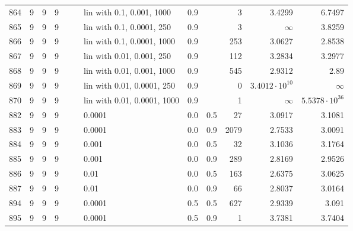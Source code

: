 \begin{longtable}{lrrrrrlrrrrr}
  864 &       9 & 9 & 9 &   &   &   lin with 0.1, 0.001, 1000 &      0.9 &        &       3 &                 3.4299 &                 6.7497 \\
  865 &       9 & 9 & 9 &   &   &   lin with 0.1, 0.0001, 250 &      0.9 &        &       3 &               $\infty$ &                 3.8259 \\
  866 &       9 & 9 & 9 &   &   &  lin with 0.1, 0.0001, 1000 &      0.9 &        &     253 &                 3.0627 &                 2.8538 \\
  867 &       9 & 9 & 9 &   &   &   lin with 0.01, 0.001, 250 &      0.9 &        &     112 &                 3.2834 &                 3.2977 \\
  868 &       9 & 9 & 9 &   &   &  lin with 0.01, 0.001, 1000 &      0.9 &        &     545 &                 2.9312 &                   2.89 \\
  869 &       9 & 9 & 9 &   &   &  lin with 0.01, 0.0001, 250 &      0.9 &        &       0 &  $3.4012\cdot 10^{10}$ &               $\infty$ \\
  870 &       9 & 9 & 9 &   &   & lin with 0.01, 0.0001, 1000 &      0.9 &        &       1 &               $\infty$ &  $5.5378\cdot 10^{36}$ \\
  882 &       9 & 9 & 9 &   &   &                      0.0001 &      0.0 &    0.5 &      27 &                 3.0917 &                 3.1081 \\
  883 &       9 & 9 & 9 &   &   &                      0.0001 &      0.0 &    0.9 &    2079 &                 2.7533 &                 3.0091 \\
  884 &       9 & 9 & 9 &   &   &                       0.001 &      0.0 &    0.5 &      32 &                 3.1036 &                 3.1764 \\
  885 &       9 & 9 & 9 &   &   &                       0.001 &      0.0 &    0.9 &     289 &                 2.8169 &                 2.9526 \\
  886 &       9 & 9 & 9 &   &   &                        0.01 &      0.0 &    0.5 &     163 &                 2.6375 &                 3.0625 \\
  887 &       9 & 9 & 9 &   &   &                        0.01 &      0.0 &    0.9 &      66 &                 2.8037 &                 3.0164 \\
  894 &       9 & 9 & 9 &   &   &                      0.0001 &      0.5 &    0.5 &     627 &                 2.9339 &                  3.091 \\
  895 &       9 & 9 & 9 &   &   &                      0.0001 &      0.5 &    0.9 &       1 &                 3.7381 &                 3.7404 \\

\end{longtable}
